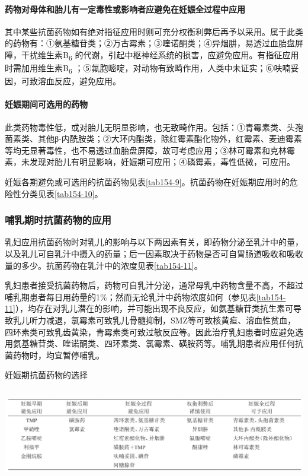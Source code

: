 \paragraph{药物对母体和胎儿有一定毒性或影响者应避免在妊娠全过程中应用}

其中某些抗菌药物如有绝对指征应用时则可充分权衡利弊后再予以采用。属于此类的药物有：①氨基糖苷类；②万古霉素；③喹诺酮类；④异烟肼，易透过血胎盘屏障，干扰维生素B\textsubscript{6}
的代谢，引起中枢神经系统的损害，应避免应用。有指征应用时需加用维生素B\textsubscript{6}
；⑤氟胞嘧啶，对动物有致畸作用，人类中未证实；⑥呋喃妥因，可致溶血反应，避免应用。

\paragraph{妊娠期间可选用的药物}

此类药物毒性低，或对胎儿无明显影响，也无致畸作用。包括：①青霉素类、头孢菌素类、其他β-内酰胺类；②大环内酯类，除红霉素酯化物外，红霉素、麦迪霉素等均无显著毒性，也不易透过血胎盘屏障，故可考虑应用；③林可霉素和克林霉素，未发现对胎儿有明显影响，妊娠期可应用；④磷霉素，毒性低微，可应用。

妊娠各期避免或可选用的抗菌药物见表\ref{tab154-9}。抗菌药物在妊娠期应用时的危险性分类见表\ref{tab154-10}。

\subsubsection{哺乳期时抗菌药物的应用}

乳妇应用抗菌药物时对乳儿的影响与以下两因素有关，即药物分泌至乳汁中的量，以及乳儿可自乳汁中摄入的药量；后一因素取决于药物是否可自胃肠道吸收和吸收量的多少。抗菌药物在乳汁中的浓度见表\ref{tab154-11}。

乳妇患者接受抗菌药物后，药物可自乳汁分泌，通常母乳中药物含量不高，不超过哺乳期患者每日用药量的1\%；然而无论乳汁中药物浓度如何（参见表\ref{tab154-11}），均存在对乳儿潜在的影响，并可能出现不良反应，如氨基糖苷类抗生素可导致乳儿听力减退，氯霉素可致乳儿骨髓抑制，SMZ等可致核黄疸、溶血性贫血，四环素类可致乳齿黄染，青霉素类可致过敏反应等。因此治疗乳妇患者时应避免选用氨基糖苷类、喹诺酮类、四环素类、氯霉素、磺胺药等。哺乳期患者应用任何抗菌药物时，均宜暂停哺乳。

\begin{table}[htbp]
\centering
\caption{妊娠期抗菌药物的选择}
\label{tab154-9}
\includegraphics[width=6.58333in,height=1.59375in]{./images/Image00597.jpg}
\end{table}

